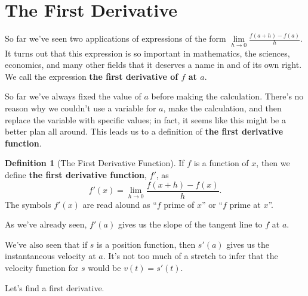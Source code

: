 \documentclass[12pt,]{book}
\newcommand{\terminology}[1]{\textbf{#1}}
\theoremstyle{plain}
\theoremstyle{definition}
\newtheorem{definition}[theorem]{Definition}
\numberwithin{equation}{section}
\newcommand{\fe}[2]{#1\mathopen{}\left(#2\right)\mathclose{}}
\newcommand{\fd}[1]{#1'}
\begin{document}
\section[The First Derivative]{The First Derivative}\label{section-first-derivative}
So far we've seen two applications of expressions of the form \(\lim\limits_{h\to0}\frac{\fe{f}{a+h}-\fe{f}{a}}{h}\). It turns out that this expression is so important in mathematics, the sciences, economics, and many other fields that it deserves a name in and of its own right. We call the expression \terminology{the first derivative of \(f\) at \(a\)}.%
\par
So far we've always fixed the value of \(a\) before making the calculation. There's no reason why we couldn't use a variable for \(a\), make the calculation, and then replace the variable with specific values; in fact, it seems like this might be a better plan all around. This leads us to a definition of \terminology{the first derivative function}.%
\begin{definition}[The First Derivative Function]\label{definition-first-derivative}
If \(f\) is a function of \(x\), then we define \terminology{the first derivative function}, \(\fd{f}\), as \[\fe{\fd{f}}{x}=\lim_{h\to0}\frac{\fe{f}{x+h}-\fe{f}{x}}{h}\text{.}\] The symbols \(\fe{\fd{f}}{x}\) are read alound as ``\(f\) prime of \(x\)'' or ``\(f\) prime at \(x\)''.%
\end{definition}
\par
As we've already seen, \(\fe{\fd{f}}{a}\) gives us the slope of the tangent line to \(f\) at \(a\).%
\par
We've also seen that if \(s\) is a position function, then \(\fe{\fd{s}}{a}\) gives us the instantaneous velocity at \(a\). It's not too much of a stretch to infer that the velocity function for \(s\) would be \(\fe{v}{t}=\fe{\fd{s}}{t}\).%
\par
Let's find a first derivative.%
\end{document}
